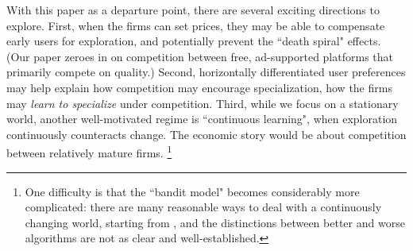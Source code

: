 \documentclass[../competing_bandits.tex]{subfiles}
\begin{document}
With this paper as a departure point, there are several exciting directions to explore.
First, when the firms can set prices, they may be able to compensate early users for exploration, and potentially prevent the ``death spiral" effects. (Our paper zeroes in on competition between free, ad-supported platforms that primarily compete on quality.)
Second, horizontally differentiated user preferences may help explain how competition may encourage specialization, \ie how the firms may \emph{learn to specialize} under competition.
Third, while we focus on a stationary world, another well-motivated regime is ``continuous learning", when exploration continuously counteracts change. The economic story would be about competition between relatively mature firms.%
\footnote{One difficulty is that the ``bandit model" becomes considerably more complicated: there are many reasonable ways to deal with a continuously changing world, starting from \citet{DynamicMAB-colt08}, and the distinctions between better and worse algorithms are not as clear and well-established.}



\end{document}

